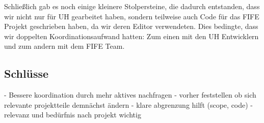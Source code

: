 Schließlich gab es noch einige kleinere Stolpersteine, die dadurch entstanden,
dass wir nicht nur für UH gearbeitet haben, sondern teilweise auch Code
für das FIFE Projekt geschrieben haben, da wir deren Editor verwendeten.
Dies bedingte, dass wir doppelten Koordinationsaufwand hatten: Zum einen mit
den UH Entwicklern und zum andern mit dem FIFE Team.

\subsection{Schlüsse}
- Bessere koordination durch mehr aktives nachfragen
- vorher feststellen ob sich relevante projektteile demnächst ändern
- klare abgrenzung hilft (scope, code)
- relevanz und bedürfnis nach projekt wichtig

